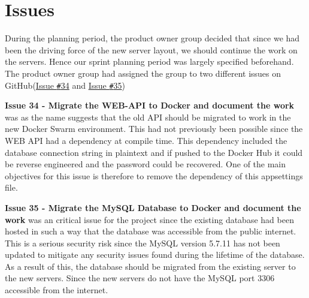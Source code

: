 \section{Issues}
During the planning period, the product owner group decided that since we had been the driving force of the new server layout, we should continue the work on the servers. 
Hence our sprint planning period was largely specified beforehand. 
The product owner group had assigned the group to two different issues on GitHub(\href{https://github.com/aau-giraf/wiki/issues/34}{Issue \texttt{\#}34} and \href{https://github.com/aau-giraf/wiki/issues/35}{Issue \texttt{\#}35})

\textbf{Issue 34 - Migrate the WEB-API to Docker and document the work} was as the name suggests that the old API should be migrated to work in the new Docker Swarm environment. 
This had not previously been possible since the WEB API had a dependency at compile time. 
This dependency included the database connection string in plaintext and if pushed to the Docker Hub it could be reverse engineered and the password could be recovered. 
One of the main objectives for this issue is therefore to remove the dependency of this appsettings file. 

\textbf{Issue 35 - Migrate the MySQL Database to Docker and document the work} was an critical issue for the project since the existing database had been hosted in such a way that the database was accessible from the public internet. 
This is a serious security risk since the MySQL version 5.7.11 has not been updated to mitigate any security issues found during the lifetime of the database. 
As a result of this, the database should be migrated from the existing server to the new servers. 
Since the new servers do not have the MySQL port $3306$ accessible from the internet. 

